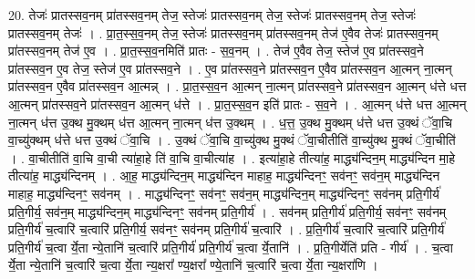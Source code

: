 \documentclass[17pt]{extarticle}
\begin{document}
20. तेजः॑ प्रातस्सव॒नम् प्रा॑तस्सव॒नम् तेज॒ स्तेजः॑ प्रातस्सव॒नम् तेज॒ स्तेजः॑ प्रातस्सव॒नम् तेज॒ स्तेजः॑ प्रातस्सव॒नम् तेजः॑ । . प्रा॒त॒स्स॒व॒नम् तेज॒ स्तेजः॑ प्रातस्सव॒नम् प्रा॑तस्सव॒नम् तेज॑ ए॒वैव तेजः॑ प्रातस्सव॒नम् प्रा॑तस्सव॒नम् तेज॑ ए॒व । . प्रा॒त॒स्स॒व॒नमिति॑ प्रातः - स॒व॒नम् । . तेज॑ ए॒वैव तेज॒ स्तेज॑ ए॒व प्रा॑तस्सव॒ने प्रा॑तस्सव॒न ए॒व तेज॒ स्तेज॑ ए॒व प्रा॑तस्सव॒ने । . ए॒व प्रा॑तस्सव॒ने प्रा॑तस्सव॒न ए॒वैव प्रा॑तस्सव॒न आ॒त्मन् ना॒त्मन् प्रा॑तस्सव॒न ए॒वैव प्रा॑तस्सव॒न आ॒त्मन्न् । . प्रा॒त॒स्स॒व॒न आ॒त्मन् ना॒त्मन् प्रा॑तस्सव॒ने प्रा॑तस्सव॒न आ॒त्मन् ध॑त्ते धत्त आ॒त्मन् प्रा॑तस्सव॒ने प्रा॑तस्सव॒न आ॒त्मन् ध॑त्ते । . प्रा॒त॒स्स॒व॒न इति॑ प्रातः - स॒व॒ने । . आ॒त्मन् ध॑त्ते धत्त आ॒त्मन् ना॒त्मन् ध॑त्त उ॒क्थ मु॒क्थम् ध॑त्त आ॒त्मन् ना॒त्मन् ध॑त्त उ॒क्थम् । . ध॒त्त॒ उ॒क्थ मु॒क्थम् ध॑त्ते धत्त उ॒क्थं ॅवा॒चि वा॒च्यु॑क्थम् ध॑त्ते धत्त उ॒क्थं ॅवा॒चि । . उ॒क्थं ॅवा॒चि वा॒च्यु॑क्थ मु॒क्थं ॅवा॒चीतीति॑ वा॒च्यु॑क्थ मु॒क्थं ॅवा॒चीति॑ । . वा॒चीतीति॑ वा॒चि वा॒ची त्या॑हा॒हे ति॑ वा॒चि वा॒चीत्या॑ह । . इत्या॑हा॒हे तीत्या॑ह॒ माद्ध्य॑न्दिन॒म् माद्ध्य॑न्दिन मा॒हे तीत्या॑ह॒ माद्ध्य॑न्दिनम् । . आ॒ह॒ माद्ध्य॑न्दिन॒म् माद्ध्य॑न्दिन माहाह॒ माद्ध्य॑न्दिनꣳ॒॒ सव॑नꣳ॒॒ सव॑न॒म् माद्ध्य॑न्दिन माहाह॒ माद्ध्य॑न्दिनꣳ॒॒ सव॑नम् । . माद्ध्य॑न्दिनꣳ॒॒ सव॑नꣳ॒॒ सव॑न॒म् माद्ध्य॑न्दिन॒म् माद्ध्य॑न्दिनꣳ॒॒ सव॑नम् प्रति॒गीर्य॑ प्रति॒गीर्य॒ सव॑न॒म् माद्ध्य॑न्दिन॒म् माद्ध्य॑न्दिनꣳ॒॒ सव॑नम् प्रति॒गीर्य॑ । . सव॑नम् प्रति॒गीर्य॑ प्रति॒गीर्य॒ सव॑नꣳ॒॒ सव॑नम् प्रति॒गीर्य॑ च॒त्वारि॑ च॒त्वारि॑ प्रति॒गीर्य॒ सव॑नꣳ॒॒ सव॑नम् प्रति॒गीर्य॑ च॒त्वारि॑ । . प्र॒ति॒गीर्य॑ च॒त्वारि॑ च॒त्वारि॑ प्रति॒गीर्य॑ प्रति॒गीर्य॑ च॒त्वा र्ये॒ता न्ये॒तानि॑ च॒त्वारि॑ प्रति॒गीर्य॑ प्रति॒गीर्य॑ च॒त्वा र्ये॒तानि॑ । . प्र॒ति॒गीर्येति॑ प्रति - गीर्य॑ । . च॒त्वा र्ये॒ता न्ये॒तानि॑ च॒त्वारि॑ च॒त्वा र्ये॒ता न्य॒क्षरा᳚ ण्य॒क्षरा᳚ ण्ये॒तानि॑ च॒त्वारि॑ च॒त्वा र्ये॒ता न्य॒क्षरा॑णि । \newline
\end{document}

